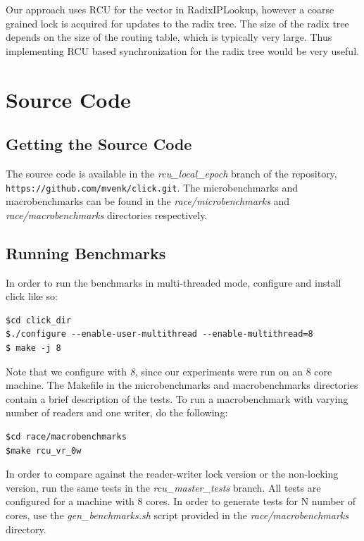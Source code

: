\documentclass[a4paper]{article}
\begin{document}
Our approach uses RCU for the vector in RadixIPLookup, however a coarse grained lock is acquired for updates to the radix tree. The size of the radix tree depends on the size of the routing table, which is typically very large. Thus implementing RCU based synchronization for the radix tree would be very useful.

\appendix
\section{Source Code}
\label{sec:source}
\subsection{Getting the Source Code}
The source code is available in the \emph{rcu\_local\_epoch} branch of the repository, \\\texttt{https://github.com/mvenk/click.git}.
The microbenchmarks and macrobenchmarks can be found in the \emph{race/microbenchmarks} and \emph{race/macrobenchmarks} directories respectively.
\subsection{Running Benchmarks}
In order to run the benchmarks in multi-threaded mode, configure and install click like so:
\begin{verbatim}
$cd click_dir
$./configure --enable-user-multithread --enable-multithread=8
$ make -j 8
\end{verbatim}
Note that we configure with \emph{8}, since our experiments were run on an 8 core machine.
The Makefile in the microbenchmarks and macrobenchmarks directories contain a brief description of the tests. To run a macrobenchmark with varying number of readers and one writer, do the following:
\begin{verbatim}
$cd race/macrobenchmarks
$make rcu_vr_0w
\end{verbatim}
In order to compare against the reader-writer lock version or the non-locking version, run the same tests in the \emph{rcu\_master\_tests} branch. All tests are configured for a machine with 8 cores. In order to generate tests for N number of cores, use the \emph{gen\_benchmarks.sh} script provided in the \emph{race/macrobenchmarks} directory.


\end{document}
